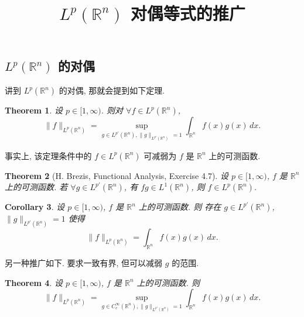 \documentclass[a4paper,11pt]{article}
\title{$ L^p(\mathbb{R}^n) $ 对偶等式的推广}
\newtheorem{theorem}{Theorem}[section]
\newtheorem{corollary}[theorem]{Corollary}
\theoremstyle{definition}
\begin{document}
\begin{CJK*}{UTF8}{gbsn}

\maketitle

\section{$ L^p(\mathbb{R}^n) $ 的对偶}

讲到 $ L^p(\mathbb{R}^n) $ 的对偶, 那就会提到如下定理.

\begin{theorem}
    设 $ p \in [1, \infty) $. 则对 $ \forall f \in L^p(\mathbb{R}^n) $,
    $$
        \| f \|_{L^p(\mathbb{R}^n)} = \sup_{g \in L^{p'}(\mathbb{R}^n), \| g \|_{L^{p'}(\mathbb{R}^n)} \, = 1} 
            \int_{\mathbb{R}^n} f(x) g(x) \, dx.
    $$
\end{theorem}

事实上, 该定理条件中的 $ f \in L^p(\mathbb{R}^n) $ 可减弱为 $ f $ 是 $ \mathbb{R}^n $ 上的可测函数.

\begin{theorem}[H. Brezis, Functional Analysis, Exercise 4.7] 
    设 $ p \in [1, \infty) $, $ f $ 是 $ \mathbb{R}^n $ 上的可测函数.
    若 $ \forall g \in L^{p'}(\mathbb{R}^n) $, 有 $ fg \in L^1(\mathbb{R}^n) $,
    则 $ f \in L^p(\mathbb{R}^n) $.
\end{theorem}

\begin{corollary}
    设 $ p \in [1, \infty) $, $ f $ 是 $ \mathbb{R}^n $ 上的可测函数. 则
    存在 $ g \in L^{p'}(\mathbb{R}^n) $,$ \| g \|_{L^{p'}(\mathbb{R}^n)} = 1 $ 使得
    $$
        \| f \|_{L^p(\mathbb{R}^n)} = \int_{\mathbb{R}^n} f(x) g(x) \, dx.
    $$
\end{corollary}

另一种推广如下. 要求一致有界, 但可以减弱 $ g $ 的范围.

\begin{theorem} \label{text}
    设 $ p \in [1, \infty) $, $ f $ 是 $ \mathbb{R}^n $ 上的可测函数. 则
    \begin{equation} \label{haha}
        \| f \|_{L^p(\mathbb{R}^n)} = \sup_{g \in C_c^\infty(\mathbb{R}^n), \| g \|_{L^{p'}(\mathbb{R}^n)} = 1} 
            \int_{\mathbb{R}^n} f(x) g(x) \, dx.
    \end{equation}
\end{theorem}


\end{CJK*}
\end{document}
